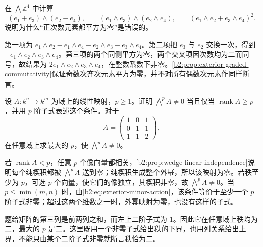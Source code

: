 \begin{exercise}\label{b2:ex:09-wedge-signs}
	在 \(\bigwedge\mathbb Z^4\) 中计算
	\[
		(e_1+e_3)\wedge(e_2-e_4),\qquad (e_1\wedge e_3)\wedge(e_2\wedge e_4),\qquad (e_1\wedge e_2+e_3\wedge e_4)^2.
	\]
	说明为什么“正次数元素都平方为零”是错误的。
\end{exercise}
\begin{solution}
	第一项为 \(e_1\wedge e_2-e_1\wedge e_4-e_2\wedge e_3-e_3\wedge e_4\)。第二项把 \(e_3\) 与 \(e_2\) 交换一次，得到 \(-e_1\wedge e_2\wedge e_3\wedge e_4\)。第三项的两个同侧平方为零，两个交叉项因次数均为二而同号，故结果为 \(2e_1\wedge e_2\wedge e_3\wedge e_4\)，在整数系数下非零。\cref{b2:prop:exterior-graded-commutativity}保证奇数次齐次元素平方为零，并不对所有偶数次元素作同样断言。
\end{solution}

\begin{exercise}\label{b2:ex:09-wedge-independence}
	设 \(A:k^n\to k^m\) 为域上的线性映射，\(p\ge1\)。证明 \(\bigwedge^pA\ne0\) 当且仅当 \(\operatorname{rank}A\ge p\)，并用 \(p\) 阶子式表述这个条件。对于
	\[
		A=\begin{pmatrix}1&0&1\\0&1&1\\1&1&2\end{pmatrix},
	\]
	在任意域上求最大的 \(p\)，使 \(\bigwedge^pA\ne0\)。
\end{exercise}
\begin{solution}
	若 \(\operatorname{rank}A<p\)，任意 \(p\) 个像向量都相关，\cref{b2:prop:wedge-linear-independence}说明每个纯楔积都被 \(\bigwedge^pA\) 送到零；纯楔积生成整个外幂，所以该映射为零。若秩至少为 \(p\)，可选 \(p\) 个向量，使它们的像独立，其楔积非零，故 \(\bigwedge^pA\ne0\)。当 \(p\le\min(m,n)\) 时，由\eqref{b2:eq:exterior-minor-action}，该条件等价于至少一个 \(p\) 阶子式非零；超过这两个维数之一时，外幂映射为零，也没有这样的子式。

	题给矩阵的第三列是前两列之和，而左上二阶子式为 \(1\)。因此它在任意域上秩均为二，最大的 \(p\) 是二。这里既用一个非零子式给出秩的下界，也用列关系给出上界，不能只由某个二阶子式非零就断言秩恰为二。
\end{solution}


